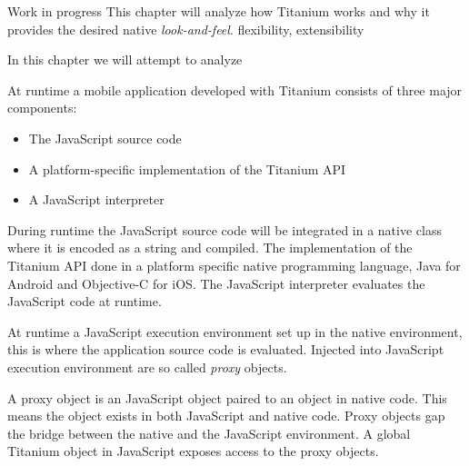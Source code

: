 
Work in progress
This chapter will analyze how Titanium works and why it provides the desired native \emph{look-and-feel}.
flexibility, extensibility

In this chapter we will attempt to analyze 


At runtime a mobile application developed with Titanium consists of three major components:
\begin{itemize}
	\item
	The JavaScript source code
	\item
	A platform-specific implementation of the Titanium API
	\item
	A JavaScript interpreter
\end{itemize}

During runtime the JavaScript source code will be integrated in a native class where it is encoded as a string and compiled. The implementation of the Titanium API done in a platform specific native programming language, Java for Android and Objective-C for iOS. The JavaScript interpreter evaluates the JavaScript code at runtime.


At runtime a JavaScript execution environment set up in the native environment, this is where the application source code is evaluated. Injected into JavaScript execution environment are so called \emph{proxy} objects.

A proxy object is an JavaScript object paired to an object in native code.\cite{Whinnery2012} This means the object exists in both JavaScript and native code. Proxy objects gap the bridge between the native and the JavaScript environment. A global Titanium object in JavaScript exposes access to the proxy objects. 




